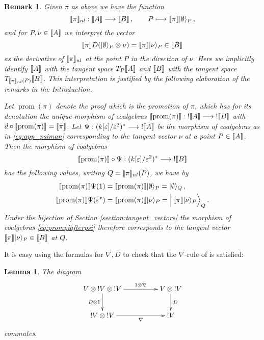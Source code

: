 \documentclass[english,letter paper,12pt,reqno]{article}
\DeclarePairedDelimiter\ket{\lvert}{\rangle}
\newtheorem{lemma}[theorem]{Lemma}
\theoremstyle{example}
\newtheorem{remark}[theorem]{Remark}
\def\be{\begin{equation}}
\def\ee{\end{equation}}
\begin{document}
\begin{remark}\label{remark:totem}
Given $\pi$ as above we have the function \cite[Definition 5.10]{murfet_ll}
\be
\den{\pi}_{nl}: \den{A} \lto \den{B}\,, \qquad P \longmapsto \den{\pi}\ket{\emptyset}_P\,,
\ee
and for $P, \nu \in \llbracket A \rrbracket$ we interpret the vector
\be
\den{\pi}D( \ket{\emptyset}_P \otimes \nu ) = \den{\pi}\ket{\nu}_P \in \den{B}
\ee
as the derivative of $\llbracket \pi \rrbracket_{nl}$ at the point $P$ in the direction of $\nu$. Here we implicitly identify $\llbracket A \rrbracket$ with the tangent space $T_P\llbracket A \rrbracket$ and $\llbracket B \rrbracket$ with the tangent space $T_{\llbracket \pi \rrbracket_{nl}(P)} \llbracket B \rrbracket$. This interpretation is justified by the following elaboration of the remarks in the Introduction. 

Let $\operatorname{prom}(\pi)$ denote the proof which is the promotion of $\pi$, which has for its denotation the unique morphism of coalgebras $\llbracket  \operatorname{prom}(\pi)  \rrbracket: {!} \llbracket A \rrbracket \longrightarrow {!} \llbracket B \rrbracket$ with $d \circ \llbracket  \operatorname{prom}(\pi)  \rrbracket = \llbracket \pi \rrbracket$. Let $\Psi: (k[\varepsilon]/\varepsilon^2)^* \longrightarrow {!} \llbracket A \rrbracket$ be the morphism of coalgebras as in \eqref{eq:app_psiman} corresponding to the tangent vector $\nu$ at a point $P \in \llbracket A \rrbracket$. Then the morphism of coalgebras
\be\label{eq:prompiafterpsi}
\den{ \operatorname{prom}(\pi) } \circ \Psi : (k[\varepsilon]/\varepsilon^2)^* \lto {!} \den{B}
\ee
has the following values, writing $Q = \llbracket \pi \rrbracket_{nl}(P)$, we have by \cite[Theorem 2.22]{murfet_coalg}
\begin{align*}
\den{ \operatorname{prom}(\pi) }\Psi(1) &= \den{ \operatorname{prom}(\pi) } \ket{\emptyset}_P = \ket{\emptyset}_Q\,,\\
\den{ \operatorname{prom}(\pi) }\Psi(\varepsilon^*) &= \den{ \operatorname{prom}(\pi) } \ket{\nu}_P = \Big|\, \den{\pi}\ket{\nu}_P \Big\rangle_Q\,.
\end{align*}
Under the bijection of Section \ref{section:tangent_vectors} the morphism of coalgebras \eqref{eq:prompiafterpsi} therefore corresponds to the tangent vector $\den{\pi}\ket{\nu}_P \in \den{B}$ at $Q$.
\end{remark}

It is easy using the formulas for $\nabla, D$ to check that the $\nabla$-rule of \cite[\S 4.3]{blutecs} is satisfied:

\begin{lemma} The diagram
\be
\xymatrix@C+2pc{
V \otimes {!} V \otimes {!} V \ar[d]_-{D \otimes 1} \ar[r]^-{1 \otimes \nabla} & V \otimes {!} V \ar[d]^-{D}\\
{!} V \otimes {!} V \ar[r]_-{\nabla} & {!} V
}
\ee
commutes.
\end{lemma}
\end{document}
